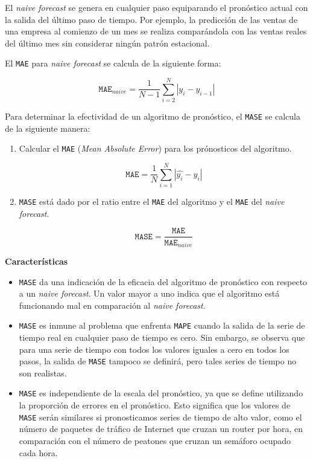 \documentclass[a4paper,12pt]{article}
\begin{document}
El \textit{naive forecast} se genera en cualquier paso equiparando el pronóstico actual con la salida del último paso de tiempo. Por ejemplo, la predicción de las ventas de una empresa al comienzo de un mes se realiza comparándola con las ventas reales del último mes sin considerar ningún patrón estacional.

El \texttt{MAE} para \textit{naive forecast} se calcula de la siguiente forma:

$$
\texttt{MAE}_{naive} = \frac{1}{N-1} \sum_{i=2}^N |y_i - y_{i-1}|
$$

Para determinar la efectividad de un algoritmo de pronóstico, el \texttt{MASE} se calcula de la siguiente manera:

\begin{enumerate}[noitemsep, topsep=2pt]
	\item Calcular el \texttt{MAE} (\textit{Mean Absolute Error}) para los prónosticos del algoritmo.
	
	$$
	\texttt{MAE} = \frac{1}{N} \sum_{i=1}^N |\hat{y_i} - y_i|	
	$$	
	\item \texttt{MASE} está dado por el ratio entre el \texttt{MAE} del algoritmo y el \texttt{MAE} del \textit{naive forecast}.
	
	$$
	\texttt{MASE} = \frac{\texttt{MAE}}{\texttt{MAE}_{naive}}	
	$$
	
\end{enumerate}

\textbf{Características}
\begin{itemize}[noitemsep, topsep=2pt]
	\item \texttt{MASE} da una indicación de la eficacia del algoritmo de pronóstico con respecto a un \textit{naive forecast}. Un valor mayor a uno indica que el algoritmo está funcionando mal en comparación al \textit{naive forecast}.

	\item \texttt{MASE} es inmune al problema que enfrenta \texttt{MAPE} cuando la salida de la serie de tiempo real en cualquier paso de tiempo es cero. Sin embargo, se observa que para una serie de tiempo con todos los valores iguales a cero en todos los pasos, la salida de \texttt{MASE} tampoco se definirá, pero tales series de tiempo no son realistas.
	
	\item \texttt{MASE} es independiente de la escala del pronóstico, ya que se define utilizando la proporción de errores en el pronóstico. Esto significa que los valores de \texttt{MASE} serán similares si pronosticamos series de tiempo de alto valor, como el número de paquetes de tráfico de Internet que cruzan un router por hora, en comparación con el número de peatones que cruzan un semáforo ocupado cada hora.
\end{itemize}
\end{document}
